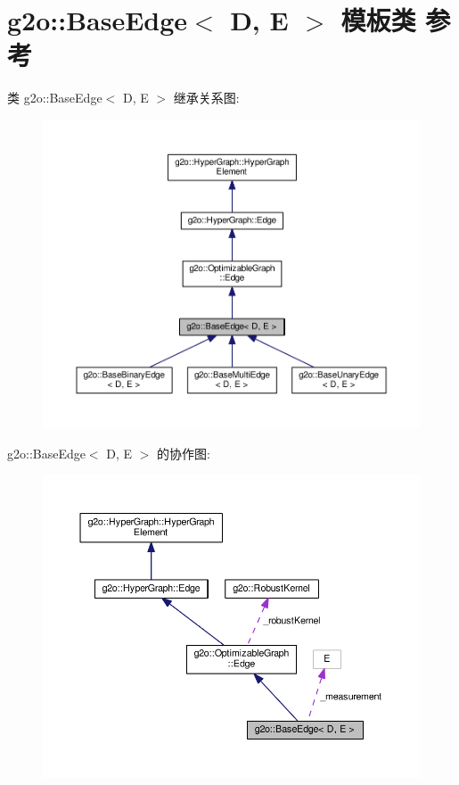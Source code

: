 \hypertarget{classg2o_1_1BaseEdge}{\section{g2o\-:\-:Base\-Edge$<$ D, E $>$ 模板类 参考}
\label{classg2o_1_1BaseEdge}
}


类 g2o\-:\-:Base\-Edge$<$ D, E $>$ 继承关系图\-:
\nopagebreak
\begin{figure}[H]
\begin{center}
\leavevmode
\includegraphics[width=350pt]{classg2o_1_1BaseEdge__inherit__graph}
\end{center}
\end{figure}


g2o\-:\-:Base\-Edge$<$ D, E $>$ 的协作图\-:
\nopagebreak
\begin{figure}[H]
\begin{center}
\leavevmode
\includegraphics[width=350pt]{classg2o_1_1BaseEdge__coll__graph}
\end{center}
\end{figure}
